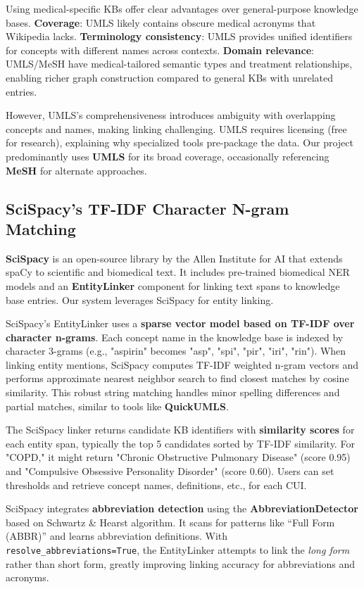 Using medical-specific KBs offer clear advantages over general-purpose knowledge bases. \textbf{Coverage}: UMLS likely contains obscure medical acronyms that Wikipedia lacks. \textbf{Terminology consistency}: UMLS provides unified identifiers for concepts with different names across contexts. \textbf{Domain relevance}: UMLS/MeSH have medical-tailored semantic types and treatment relationships, enabling richer graph construction compared to general KBs with unrelated entries.

However, UMLS's comprehensiveness introduces ambiguity with overlapping concepts and names, making linking challenging. UMLS requires licensing (free for research), explaining why specialized tools pre-package the data. Our project predominantly uses \textbf{UMLS} for its broad coverage, occasionally referencing \textbf{MeSH} for alternate approaches.

\subsection{SciSpacy's TF-IDF Character N-gram Matching}

\textbf{SciSpacy} \parencite{Neumann2019} is an open-source library by the Allen Institute for AI that extends spaCy to scientific and biomedical text. It includes pre-trained biomedical NER models and an \textbf{EntityLinker} component for linking text spans to knowledge base entries. Our system leverages SciSpacy for entity linking.

SciSpacy's EntityLinker uses a \textbf{sparse vector model based on TF-IDF over character n-grams}. Each concept name in the knowledge base is indexed by character 3-grams (e.g., "aspirin" becomes "asp", "spi", "pir", "iri", "rin"). When linking entity mentions, SciSpacy computes TF-IDF weighted n-gram vectors and performs approximate nearest neighbor search to find closest matches by cosine similarity. This robust string matching handles minor spelling differences and partial matches, similar to tools like \textbf{QuickUMLS}.

The SciSpacy linker returns candidate KB identifiers with \textbf{similarity scores} for each entity span, typically the top 5 candidates sorted by TF-IDF similarity. For "COPD," it might return "Chronic Obstructive Pulmonary Disease" (score 0.95) and "Compulsive Obsessive Personality Disorder" (score 0.60). Users can set thresholds and retrieve concept names, definitions, etc., for each CUI.

SciSpacy integrates \textbf{abbreviation detection} using the \textbf{AbbreviationDetector} based on Schwartz \& Hearst algorithm. It scans for patterns like ``Full Form (ABBR)'' and learns abbreviation definitions. With \texttt{resolve\_abbreviations=True}, the EntityLinker attempts to link the \emph{long form} rather than short form, greatly improving linking accuracy for abbreviations and acronyms.

